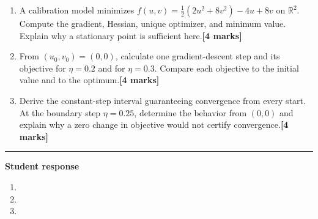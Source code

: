 \documentclass[11pt,a4paper]{article}
\newlength{\BlankAnswerHeight}\setlength{\BlankAnswerHeight}{16mm}
\newcommand{\AnswerBlank}{\leavevmode\par\vspace{\BlankAnswerHeight}}
\begin{document}
\begin{enumerate}[label=(\alph*),leftmargin=8mm,itemsep=3pt]
\item A calibration model minimizes \(f(u,v)=\tfrac12(2u^2+8v^2)-4u+8v\) on \(\mathbb R^2\). Compute the gradient, Hessian, unique optimizer, and minimum value. Explain why a stationary point is sufficient here.\hfill\textbf{[4 marks]}
\item From \((u_0,v_0)=(0,0)\), calculate one gradient-descent step and its objective for \(\eta=0.2\) and for \(\eta=0.3\). Compare each objective to the initial value and to the optimum.\hfill\textbf{[4 marks]}
\item Derive the constant-step interval guaranteeing convergence from every start. At the boundary step \(\eta=0.25\), determine the behavior from \((0,0)\) and explain why a zero change in objective would not certify convergence.\hfill\textbf{[4 marks]}
\end{enumerate}\par\medskip\hrule\medskip\textbf{Student response}\par
\begin{enumerate}[label=(\alph*),leftmargin=8mm,itemsep=3pt]
\item
\AnswerBlank
\item
\AnswerBlank
\item
\AnswerBlank
\end{enumerate}
\end{document}
